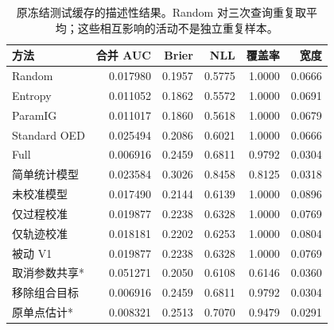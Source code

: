 \begin{table}[H]
\centering
\caption{原冻结测试缓存的描述性结果。Random 对三次查询重复取平均；这些相互影响的活动不是独立重复样本。}
\label{tab:golden}
\scriptsize
\setlength{\tabcolsep}{3pt}
\begin{tabular}{lrrrrr}
\toprule
方法 & 合并 AUC & Brier & NLL & 覆盖率 & 宽度 \\
\midrule
Random & 0.017980 & 0.1957 & 0.5775 & 1.0000 & 0.0666 \\
Entropy & 0.011052 & 0.1862 & 0.5572 & 1.0000 & 0.0691 \\
ParamIG & 0.011017 & 0.1860 & 0.5618 & 1.0000 & 0.0679 \\
Standard OED & 0.025494 & 0.2086 & 0.6021 & 1.0000 & 0.0666 \\
Full & 0.006916 & 0.2459 & 0.6811 & 0.9792 & 0.0304 \\
简单统计模型 & 0.023584 & 0.3026 & 0.8458 & 0.8125 & 0.0318 \\
未校准模型 & 0.017490 & 0.2144 & 0.6139 & 1.0000 & 0.0896 \\
仅过程校准 & 0.019877 & 0.2238 & 0.6328 & 1.0000 & 0.0769 \\
仅轨迹校准 & 0.018181 & 0.2202 & 0.6253 & 1.0000 & 0.0804 \\
被动 V1 & 0.019877 & 0.2238 & 0.6328 & 1.0000 & 0.0769 \\
取消参数共享* & 0.051271 & 0.2050 & 0.6108 & 0.6146 & 0.0360 \\
移除组合目标 & 0.006916 & 0.2459 & 0.6811 & 0.9792 & 0.0304 \\
原单点估计* & 0.008321 & 0.2513 & 0.7070 & 0.9479 & 0.0291 \\
\bottomrule
\end{tabular}
\end{table}
